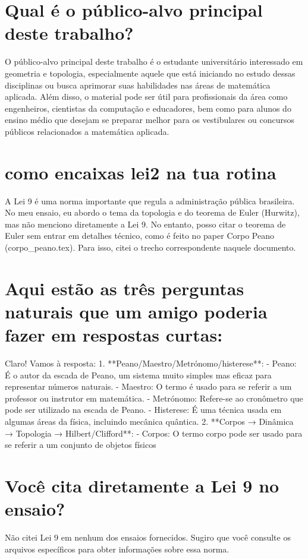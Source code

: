 \documentclass[11pt,a4paper]{article}
\begin{document}
\section{Qual é o público-alvo principal deste trabalho?}
O público-alvo principal deste trabalho é o estudante universitário interessado em geometria e topologia, especialmente aquele que está iniciando no estudo dessas disciplinas ou busca aprimorar suas habilidades nas áreas de matemática aplicada. Além disso, o material pode ser útil para profissionais da área como engenheiros, cientistas da computação e educadores, bem como para alunos do ensino médio que desejam se preparar melhor para os vestibulares ou concursos públicos relacionados a matemática aplicada.

\section{como encaixas lei2 na tua rotina}
A Lei 9 é uma norma importante que regula a administração pública brasileira. No meu ensaio, eu abordo o tema da topologia e do teorema de Euler (Hurwitz), mas não menciono diretamente a Lei 9. No entanto, posso citar o teorema de Euler sem entrar em detalhes técnico, como é feito no paper Corpo Peano (corpo\_peano.tex). Para isso, citei o trecho correspondente naquele documento.

\section{Aqui estão as três perguntas naturais que um amigo poderia fazer em respostas curtas:}
Claro! Vamos à resposta: 1. **Peano/Maestro/Metrónomo/histerese**: - Peano: É o autor da escada de Peano, um sistema muito simples mas eficaz para representar números naturais. - Maestro: O termo é usado para se referir a um professor ou instrutor em matemática. - Metrónomo: Refere-se ao cronômetro que pode ser utilizado na escada de Peano. - Histerese: É uma técnica usada em algumas áreas da física, incluindo mecânica quântica. 2. **Corpos → Dinâmica → Topologia → Hilbert/Clifford**: - Corpos: O termo corpo pode ser usado para se referir a um conjunto de objetos físicos

\section{Você cita diretamente a Lei 9 no ensaio?}
Não citei Lei 9 em nenhum dos ensaios fornecidos. Sugiro que você consulte os arquivos específicos para obter informações sobre essa norma.
\end{document}
